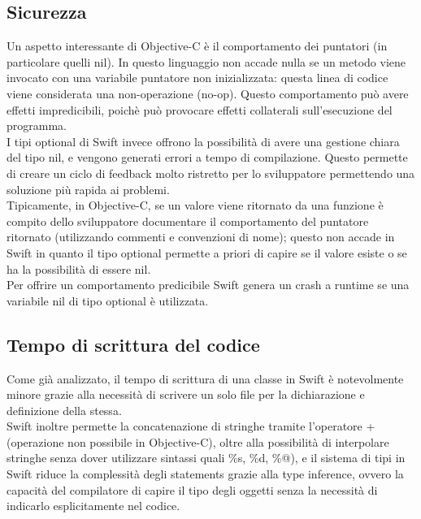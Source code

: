 \subsection{Sicurezza} 
Un aspetto interessante di Objective-C è il comportamento dei puntatori (in particolare quelli nil). In questo linguaggio non accade nulla se un metodo viene invocato con una variabile puntatore non inizializzata: questa linea di codice viene considerata una non-operazione (no-op). Questo comportamento può avere effetti impredicibili, poichè può provocare effetti collaterali sull'esecuzione del programma.\\
I tipi optional di Swift invece offrono la possibilità di avere una gestione chiara del tipo nil, e vengono generati errori a tempo di compilazione. Questo permette di creare un ciclo di feedback molto ristretto per lo sviluppatore permettendo una soluzione più rapida ai problemi.\\
Tipicamente, in Objective-C, se un valore viene ritornato da una funzione è compito dello sviluppatore documentare il comportamento del puntatore ritornato (utilizzando commenti e convenzioni di nome); questo non accade in Swift in quanto il tipo optional permette a priori di capire se il valore esiste o se ha la possibilità di essere nil.\\ Per offrire un comportamento predicibile Swift genera un crash a runtime se una variabile nil di tipo optional è utilizzata.\\
\subsection{Tempo di scrittura del codice}
Come già analizzato, il tempo di scrittura di una classe in Swift è notevolmente minore grazie alla necessità di scrivere un solo file per la dichiarazione e definizione della stessa.\\Swift inoltre permette la concatenazione di stringhe tramite l'operatore + (operazione non possibile in Objective-C), oltre alla possibilità di interpolare stringhe senza dover utilizzare sintassi quali \%s, \%d, \%@), e il sistema di tipi in Swift riduce la complessità degli statements grazie alla type inference, ovvero la capacità del compilatore di capire il tipo degli oggetti senza la necessità di indicarlo esplicitamente nel codice.
